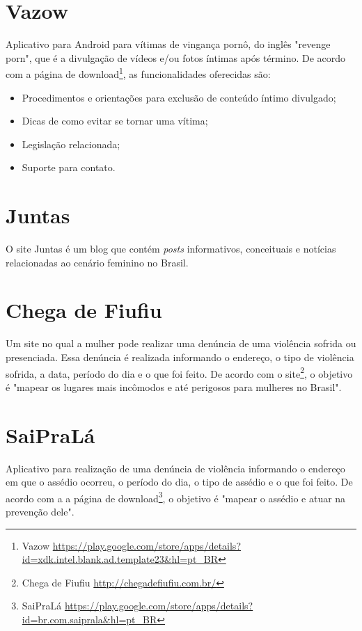 \section*{Vazow}

Aplicativo para Android para vítimas de vingança pornô, do inglês "revenge porn", que é a 
divulgação de vídeos e/ou fotos íntimas após término.
De acordo com a página de download\footnote{Vazow \url{https://play.google.com/store/apps/details?id=xdk.intel.blank.ad.template23&hl=pt_BR}}, as funcionalidades oferecidas são:

\begin{itemize}
	\item Procedimentos e orientações para exclusão de conteúdo íntimo divulgado;
	\item Dicas de como evitar se tornar uma vítima;
	\item Legislação relacionada;
	\item Suporte para contato.
\end{itemize}

\section*{Juntas}

O site Juntas é um blog que contém \textit{posts} informativos, conceituais e notícias 
relacionadas ao cenário feminino no Brasil.

\section*{Chega de Fiufiu}

Um site no qual a mulher pode realizar uma denúncia de uma violência sofrida ou presenciada. 
Essa denúncia é realizada informando o endereço, o tipo de violência sofrida, a data, período do dia e o que foi feito. De acordo com o site\footnote{Chega de Fiufiu \url{http://chegadefiufiu.com.br/}}, o objetivo é "mapear os lugares mais incômodos e até perigosos para mulheres no Brasil".

\section*{SaiPraLá}

Aplicativo para realização de uma denúncia de violência informando o endereço em que o assédio ocorreu, o período do dia, o tipo de assédio e o que foi feito. De acordo com a a página de download\footnote{SaiPraLá \url{https://play.google.com/store/apps/details?id=br.com.saiprala&hl=pt_BR}}, o objetivo é "mapear o assédio e atuar na prevenção dele".

